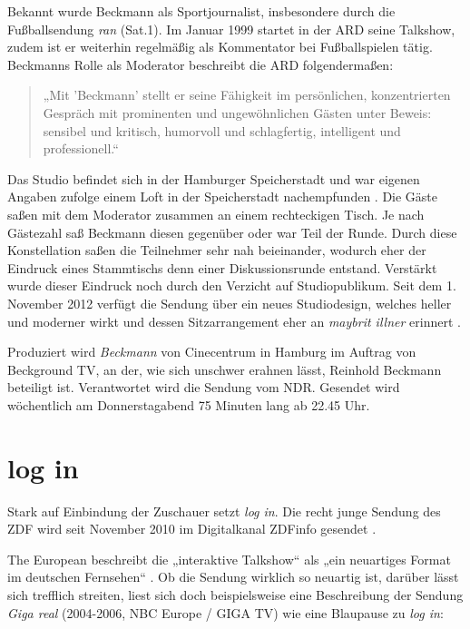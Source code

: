 Bekannt wurde Beckmann als Sportjournalist, insbesondere durch die Fußballsendung \textit{ran} (Sat.1). Im Januar 1999 startet in der ARD seine Talkshow, zudem ist er weiterhin  regelmäßig als Kommentator bei Fußballspielen tätig. Beckmanns Rolle als Moderator beschreibt die ARD folgendermaßen:

\begin{quote}
	„Mit 'Beckmann' stellt er seine Fähigkeit im persönlichen, konzentrierten Gespräch mit prominenten und ungewöhnlichen Gästen unter Beweis: sensibel und kritisch, humorvoll und schlagfertig, intelligent und professionell.“ \parencite{ardBeckmannModeratoro.J.}
\end{quote}

Das Studio befindet sich in der Hamburger Speicherstadt und war eigenen Angaben zufolge einem Loft in der Speicherstadt nachempfunden \parencite{ardBeckmannStudioo.J.}. Die Gäste saßen mit dem Moderator zusammen an einem rechteckigen Tisch. Je nach Gästezahl saß Beckmann diesen gegenüber oder war Teil der Runde. Durch diese Konstellation saßen die Teilnehmer sehr nah beieinander, wodurch eher der Eindruck eines Stammtischs denn einer Diskussionsrunde entstand. Verstärkt wurde dieser Eindruck noch durch den Verzicht auf Studiopublikum. Seit dem 1. November 2012 verfügt die Sendung über ein neues Studiodesign, welches heller und moderner wirkt und dessen Sitzarrangement eher an \textit{maybrit illner} erinnert \parencite{ardNeuesBeckmannStudioo.J.}.

Produziert wird \textit{Beckmann} von Cinecentrum in Hamburg im Auftrag von Beckground TV, an der, wie sich unschwer erahnen lässt, Reinhold Beckmann beteiligt ist. Verantwortet wird die Sendung vom NDR. Gesendet wird wöchentlich am Donnerstagabend 75 Minuten lang ab 22.45 Uhr.

\section{log in}

Stark auf Einbindung der Zuschauer setzt \textit{log in}. Die recht junge Sendung des ZDF wird seit November 2010 im Digitalkanal ZDFinfo gesendet \parencite{kluczniokLogZDFUnd2010}.

The European beschreibt die „interaktive Talkshow“ als „ein neuartiges Format im deutschen Fernsehen“ \parencite{o.a.WolfChristianUlrich2011}. Ob die Sendung wirklich so neuartig ist, darüber lässt sich trefflich streiten, liest sich doch beispielsweise eine Beschreibung der Sendung \textit{Giga real} (2004-2006, NBC Europe / GIGA TV) wie eine Blaupause zu \textit{log in}:

